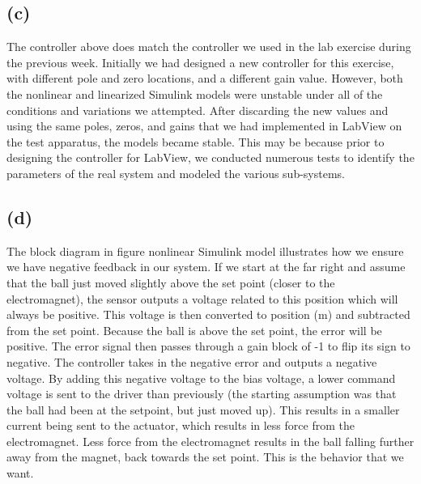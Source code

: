 \documentclass[letterpaper]{article}
\begin{document}
\subsection*{(c)}
The controller above does match the controller we used in the lab exercise during the previous week. Initially we had designed a new controller for this exercise, with different pole and zero locations, and a different gain value. However, both the nonlinear and linearized Simulink models were unstable under all of the conditions and variations we attempted. After discarding the new values and using the same poles, zeros, and gains that we had implemented in LabView on the test apparatus, the models became stable. This may be because prior to designing the controller for LabView, we conducted numerous tests to identify the parameters of the real system and modeled the various sub-systems. 
\subsection*{(d)}
The block diagram in figure nonlinear Simulink model illustrates how we ensure we have negative feedback in our system. If we start at the far right and assume that the ball just moved slightly above the set point (closer to the electromagnet), the sensor outputs a voltage related to this position which will always be positive. This voltage is then converted to position (m) and subtracted from the set point. Because the ball is above the set point, the error will be positive. The error signal then passes through a gain block of -1 to flip its sign to negative. The controller takes in the negative error and outputs a negative voltage. By adding this negative voltage to the bias voltage, a lower command voltage is sent to the driver than previously (the starting assumption was that the ball had been at the setpoint, but just moved up). This results in a smaller current being sent to the actuator, which results in less force from the electromagnet. Less force from the electromagnet results in the ball falling further away from the magnet, back towards the set point. This is the behavior that we want.
\end{document}
